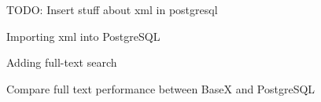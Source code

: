 TODO: Insert stuff about xml in postgresql

Importing xml into PostgreSQL

Adding full-text search 

Compare full text performance between BaseX and PostgreSQL